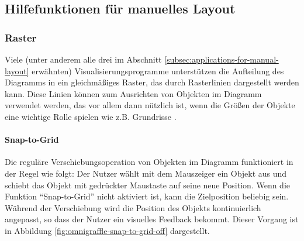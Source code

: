 \subsection{Hilfefunktionen für manuelles Layout}
\label{subsec:help-functions-for-manual-layout}

\subsubsection{Raster}
\label{subsubsec:grid}

Viele (unter anderem alle drei im Abschnitt \ref{subsec:applications-for-manual-layout} erwähnten) Visualisierungsprogramme unterstützen die Aufteilung des Diagramms in ein gleichmäßiges Raster, das durch Rasterlinien dargestellt werden kann. Diese Linien können zum Ausrichten von Objekten im Diagramm verwendet werden, das vor allem dann nützlich ist, wenn die Größen der Objekte eine wichtige Rolle spielen wie z.B. Grundrisse \cite{08OmniGraffle, Olsen10OmniGraffle, 11Keynote, 14Visual}.

\paragraph{Snap-to-Grid}

Die reguläre Verschiebungsoperation von Objekten im Diagramm funktioniert in der Regel wie folgt: Der Nutzer wählt mit dem Mauszeiger ein Objekt aus und schiebt das Objekt mit gedrückter Maustaste auf seine neue Position. Wenn die Funktion \enquote{Snap-to-Grid} nicht aktiviert ist, kann die Zielposition beliebig sein. Während der Verschiebung wird die Position des Objekts kontinuierlich angepasst, so dass der Nutzer ein visuelles Feedback bekommt. Dieser Vorgang ist in Abbildung \ref{fig:omnigraffle-snap-to-grid-off} dargestellt.

